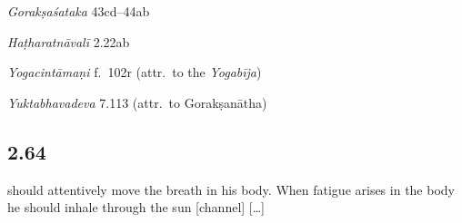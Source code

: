 \begin{ekdosis}
\begin{sources}[hp02_063]
\emph{Gorakṣaśataka} 43cd–44ab

\begin{versinnote}
\end{versinnote}
\end{sources}

\begin{testimonia}[hp02_063]
\emph{Haṭharatnāvalī} 2.22ab

\begin{versinnote}
\tl{\var{bhastrī ] bhastrā n4}\\!}
\end{versinnote} 

\emph{Yogacintāmaṇi} f.~102r (attr.~to the \emph{Yogabīja})

\begin{versinnote}
\end{versinnote}


\emph{Yuktabhavadeva} 7.113 (attr.~to Gorakṣanātha)

\begin{versinnote}
\end{versinnote}
\end{testimonia}


\subsection*{2.64}
\begin{translation} should attentively move the breath in his body. When fatigue arises in the body he should inhale through the sun [channel] [\ldots]
\end{translation}


\end{ekdosis}
